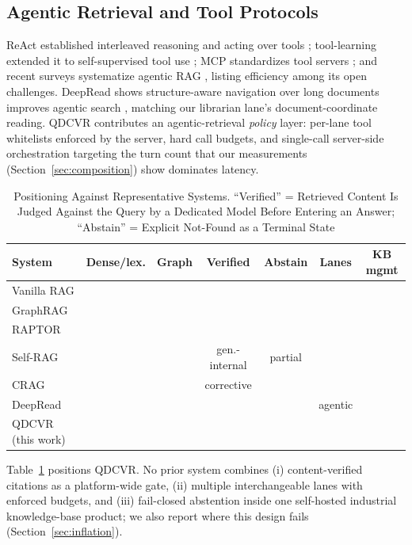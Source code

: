 \documentclass[journal]{IEEEtran}
\newcommand{\yes}{\checkmark}
\begin{document}
\subsection{Agentic Retrieval and Tool Protocols}
ReAct established interleaved reasoning and acting over tools
\cite{react-yao}; tool-learning extended it to self-supervised tool use
\cite{toolformer}; MCP standardizes tool servers \cite{mcp}; and recent
surveys systematize agentic RAG \cite{singh-agentic-rag}, listing
efficiency among its open challenges. DeepRead shows structure-aware
navigation over long documents improves agentic search \cite{deepread},
matching our librarian lane's document-coordinate reading. QDCVR
contributes an agentic-retrieval \emph{policy} layer: per-lane tool
whitelists enforced by the server, hard call budgets, and single-call
server-side orchestration targeting the turn count that our measurements
(Section~\ref{sec:composition}) show dominates latency.

\begin{table}[!t]
\centering
\footnotesize
\setlength{\tabcolsep}{3.6pt}
\caption{Positioning Against Representative Systems. ``Verified'' =
Retrieved Content Is Judged Against the Query by a Dedicated Model Before
Entering an Answer; ``Abstain'' = Explicit Not-Found as a Terminal State}
\label{tab:positioning}
\begin{tabular}{lcccccc}
\toprule
System & Dense/lex. & Graph & Verified & Abstain & Lanes & KB mgmt \\
\midrule
Vanilla RAG \cite{rag-lewis} & \yes &        &            &        &        &        \\
GraphRAG \cite{graphrag}     & \yes & \yes    &            &        &        &        \\
RAPTOR \cite{raptor}         & \yes &        &            &        &        &        \\
Self-RAG \cite{selfrag}      & \yes &        & gen.-internal & partial &  &   \\
CRAG \cite{crag}             & \yes &        & corrective &        &        &        \\
DeepRead \cite{deepread}     & \yes &        &            &        & agentic &  \\
\midrule
QDCVR (this work)            & \yes & \yes   & \yes       & \yes   & \yes   & \yes \\
\bottomrule
\end{tabular}
\end{table}

Table~\ref{tab:positioning} positions QDCVR. No prior system combines
(i) content-verified citations as a platform-wide gate, (ii) multiple
interchangeable lanes with enforced budgets, and (iii) fail-closed
abstention inside one self-hosted industrial knowledge-base product; we
also report where this design fails (Section~\ref{sec:inflation}).
\end{document}
